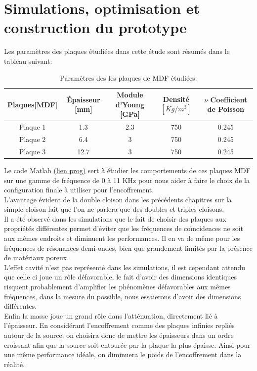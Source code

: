 \documentclass[12pt,foolscap]{report}
\begin{document}
	\chapter{Simulations, optimisation et construction du prototype}
	
	Les paramètres des plaques étudiées dans cette étude sont résumés dans le tableau suivant:
	
	\begin{table}[h]
		\centering
		\begin{tabular}{|c|c|c|c|c|}
			\hline
			Plaques[MDF]& Épaisseur [mm]& Module d'Young [GPa]& Densité $[Kg/m^3] $& $\nu$ Coefficient de Poisson  \\ \hline
			Plaque 1 & 1.3 & 2.3 & 750 & 0.245 \\ \hline
			Plaque 2 & 6.4 & 3 & 750 & 0.245\\ \hline
			Plaque 3 & 12.7 & 3 & 750 & 0.245\\ \hline
		\end{tabular}
		\caption{Paramètres des les plaques de MDF étudiées.}
		\label{tab:paraplaques}
	\end{table}
	
	Le code Matlab \href{https://github.com/Nuopel/Encoffrement/blob/master/Programme/comparaison_cloison_amortissement_TransMat.m}{(lien prog)} sert à étudier les comportements de ces plaques MDF sur une gamme de fréquence de 0 à 11 KHz pour nous aider à faire le choix de la configuration finale à utiliser pour l'encoffrement.\\
	L'avantage évident de la double cloison dans les précédents chapitres sur la simple cloison fait que l'on ne parlera que des doubles et triples cloisons.\\ Il a été observé dans les simulations que le fait de choisir des plaques aux propriétés différentes permet d'éviter que les fréquences de coïncidences ne soit aux mêmes endroits et diminuent les performances. Il en va de même pour les fréquences de résonances demi-ondes, bien que grandement limités par la présence de matériaux poreux.\\ L'effet cavité n'est pas représenté dans les simulations, il est cependant attendu que celle ci joue un rôle défavorable, le fait d'avoir des dimensions identiques risquent probablement d'amplifier les phénomènes défavorables aux mêmes fréquences, dans la mesure du possible, nous essaierons d'avoir des dimensions différentes.\\
	Enfin la masse joue un grand rôle dans l'atténuation, directement lié à l'épaisseur. En considérant l'encoffrement comme des plaques infinies repliés autour de la source, on choisira donc de mettre les épaisseurs dans un ordre croissant afin que la source soit entourée par la plaque la plus épaisse. Ainsi pour une même performance idéale, on diminuera le poids de l'encoffrement dans la réalité.\\
	
\end{document}
